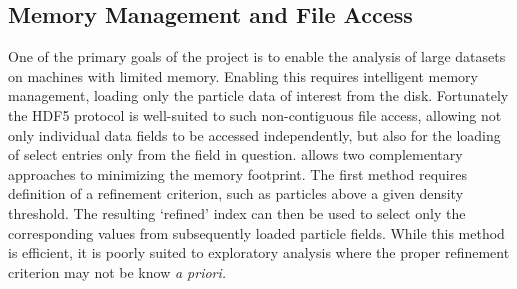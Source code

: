 \subsection{Memory Management and File Access}
\label{sec:fileIO}
One of the primary goals of the  project is to enable the analysis of large datasets on machines with limited memory.
Enabling this requires intelligent memory management, loading only the particle data of interest from the disk.
Fortunately the HDF5 protocol is well-suited to such non-contiguous file access, allowing not only individual data fields to be accessed independently, but also for the loading of select entries only from the field in question.
 allows two complementary approaches to minimizing the memory footprint.
The first method requires definition of a refinement criterion, such as particles above a given density threshold.
The resulting `refined' index can then be used to select only the corresponding values from subsequently loaded particle fields.
While this method is efficient, it is poorly suited to exploratory analysis where the proper refinement criterion may not be know \it{a priori}.